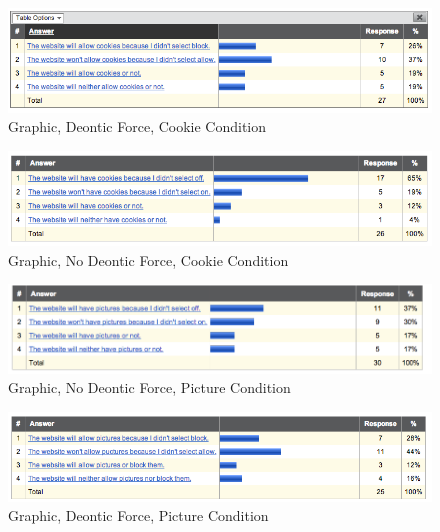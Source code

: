 \begin{figure}[h!]
\centerline{
\includegraphics[scale=.44]{chapter5.tex/raw5}
}
\caption{Graphic, Deontic Force, Cookie Condition}
\end{figure}


\begin{figure}[h!]
\centerline{
\includegraphics[scale=.45]{chapter5.tex/raw6}
}
\caption{Graphic, No Deontic Force, Cookie Condition}
\end{figure}


\begin{figure}[h!]
\centerline{
\includegraphics[scale=.38]{chapter5.tex/raw7}
}
\caption{Graphic, No Deontic Force, Picture Condition}
\end{figure}


\begin{figure}[h!]
\centerline{
\includegraphics[scale=.45]{chapter5.tex/raw8}
}
\caption{Graphic, Deontic Force, Picture Condition}
\end{figure}